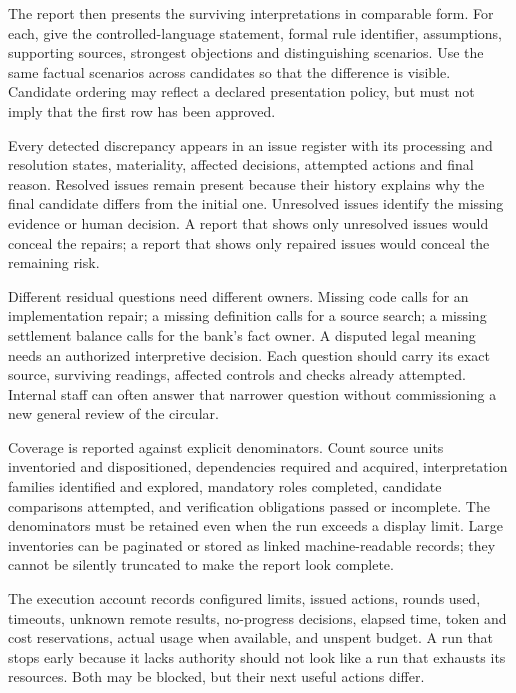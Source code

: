 The report then presents the surviving interpretations in comparable form. For
each, give the controlled-language statement, formal rule identifier, assumptions,
supporting sources, strongest objections and distinguishing scenarios. Use the
same factual scenarios across candidates so that the difference is visible.
Candidate ordering may reflect a declared presentation policy, but must not imply
that the first row has been approved.

Every detected discrepancy appears in an issue register with its processing and
resolution states, materiality, affected decisions, attempted actions and final
reason. Resolved issues remain present because their history explains why the
final candidate differs from the initial one. Unresolved issues identify the
missing evidence or human decision. A report that shows only unresolved issues
would conceal the repairs; a report that shows only repaired issues would conceal
the remaining risk.

Different residual questions need different owners. Missing code calls for an
implementation repair; a missing definition calls for a source search; a missing
settlement balance calls for the bank's fact owner. A disputed legal meaning
needs an authorized interpretive decision. Each question should carry its exact
source, surviving readings, affected controls and checks already attempted.
Internal staff can often answer that narrower question without commissioning a
new general review of the circular.

Coverage is reported against explicit denominators. Count source units inventoried
and dispositioned, dependencies required and acquired, interpretation families
identified and explored, mandatory roles completed, candidate comparisons
attempted, and verification obligations passed or incomplete. The denominators
must be retained even when the run exceeds a display limit. Large inventories
can be paginated or stored as linked machine-readable records; they cannot be
silently truncated to make the report look complete.


The execution account records configured limits, issued actions, rounds used,
timeouts, unknown remote results, no-progress decisions, elapsed time, token and
cost reservations, actual usage when available, and unspent budget. A run that
stops early because it lacks authority should not look like a run that exhausts
its resources. Both may be blocked, but their next useful actions differ.

